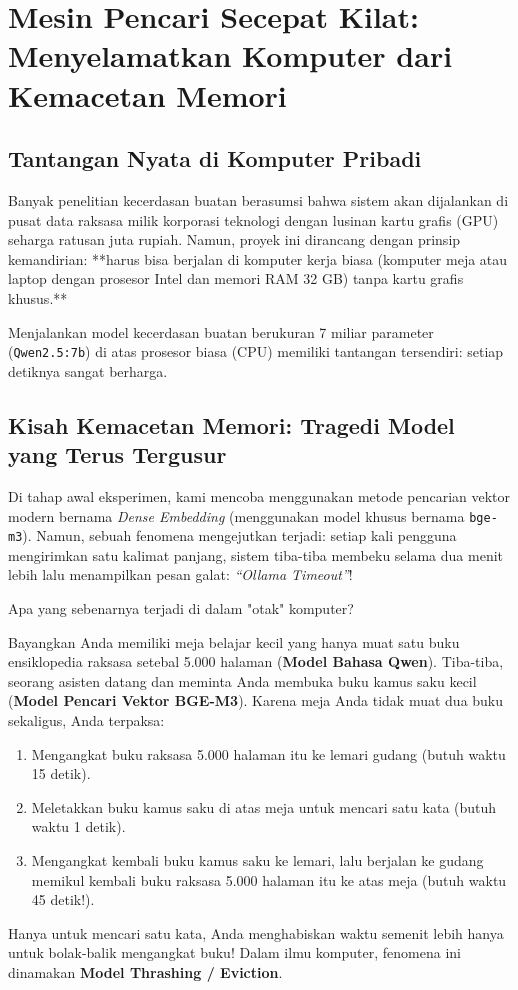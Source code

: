 \chapter{Mesin Pencari Secepat Kilat: Menyelamatkan Komputer dari Kemacetan Memori}

\section{Tantangan Nyata di Komputer Pribadi}
Banyak penelitian kecerdasan buatan berasumsi bahwa sistem akan dijalankan di pusat data raksasa milik korporasi teknologi dengan lusinan kartu grafis (GPU) seharga ratusan juta rupiah. Namun, proyek ini dirancang dengan prinsip kemandirian: **harus bisa berjalan di komputer kerja biasa (komputer meja atau laptop dengan prosesor Intel dan memori RAM 32 GB) tanpa kartu grafis khusus.**

Menjalankan model kecerdasan buatan berukuran 7 miliar parameter (\texttt{Qwen2.5:7b}) di atas prosesor biasa (CPU) memiliki tantangan tersendiri: setiap detiknya sangat berharga.

\section{Kisah Kemacetan Memori: Tragedi Model yang Terus Tergusur}
Di tahap awal eksperimen, kami mencoba menggunakan metode pencarian vektor modern bernama \textit{Dense Embedding} (menggunakan model khusus bernama \texttt{bge-m3}). Namun, sebuah fenomena mengejutkan terjadi: setiap kali pengguna mengirimkan satu kalimat panjang, sistem tiba-tiba membeku selama dua menit lebih lalu menampilkan pesan galat: \textit{“Ollama Timeout”}!

Apa yang sebenarnya terjadi di dalam "otak" komputer?

\begin{infobox}
Bayangkan Anda memiliki meja belajar kecil yang hanya muat satu buku ensiklopedia raksasa setebal 5.000 halaman (\textbf{Model Bahasa Qwen}). 
Tiba-tiba, seorang asisten datang dan meminta Anda membuka buku kamus saku kecil (\textbf{Model Pencari Vektor BGE-M3}). Karena meja Anda tidak muat dua buku sekaligus, Anda terpaksa:
\begin{enumerate}
    \item Mengangkat buku raksasa 5.000 halaman itu ke lemari gudang (butuh waktu 15 detik).
    \item Meletakkan buku kamus saku di atas meja untuk mencari satu kata (butuh waktu 1 detik).
    \item Mengangkat kembali buku kamus saku ke lemari, lalu berjalan ke gudang memikul kembali buku raksasa 5.000 halaman itu ke atas meja (butuh waktu 45 detik!).
\end{enumerate}
Hanya untuk mencari satu kata, Anda menghabiskan waktu semenit lebih hanya untuk bolak-balik mengangkat buku! Dalam ilmu komputer, fenomena ini dinamakan \textbf{Model Thrashing / Eviction}.
\end{infobox}

